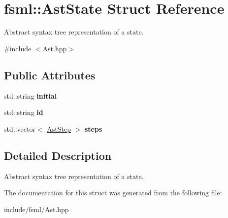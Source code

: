 \hypertarget{structfsml_1_1AstState}{\section{fsml\-:\-:Ast\-State Struct Reference}
\label{structfsml_1_1AstState}
}


Abstract syntax tree representation of a state.  




{\ttfamily \#include $<$Ast.\-hpp$>$}

\subsection*{Public Attributes}
\begin{DoxyCompactItemize}
\item 
\hypertarget{structfsml_1_1AstState_a89a44c91811564d41c48343cf34560cd}{std\-::string {\bfseries initial}}\label{structfsml_1_1AstState_a89a44c91811564d41c48343cf34560cd}

\item 
\hypertarget{structfsml_1_1AstState_a3e7e96d12d2e17d8d35d313b232cb4f5}{std\-::string {\bfseries id}}\label{structfsml_1_1AstState_a3e7e96d12d2e17d8d35d313b232cb4f5}

\item 
\hypertarget{structfsml_1_1AstState_a39a00b99d02537f2b014556c203d9c36}{std\-::vector$<$ \hyperlink{structfsml_1_1AstStep}{Ast\-Step} $>$ {\bfseries steps}}\label{structfsml_1_1AstState_a39a00b99d02537f2b014556c203d9c36}

\end{DoxyCompactItemize}


\subsection{Detailed Description}
Abstract syntax tree representation of a state. 



The documentation for this struct was generated from the following file\-:\begin{DoxyCompactItemize}
\item 
include/fsml/Ast.\-hpp\end{DoxyCompactItemize}
